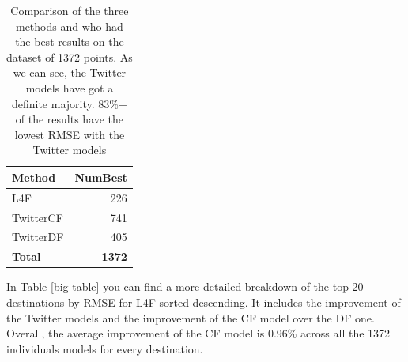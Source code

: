 \documentclass[minf,frontabs,twoside,singlespacing,parskip]{infthesis}
\begin{document}
\begin{table}[h!]
\begin{center}
\begin{tabular}{ l | r }
Method & NumBest \\
\hline
L4F & 226 \\
TwitterCF & 741 \\
TwitterDF & 405 \\
\hline
\textbf{Total} & \textbf{1372}
\end{tabular}
\end{center}
\caption{Comparison of the three methods and who had the best results on the dataset of 1372 points. As we can see, the Twitter models have got a definite majority. 83\%+ of the results have the lowest RMSE with the Twitter models}
\label{comparison-all}
\end{table}

In Table \ref{big-table} you can find a more detailed breakdown of the top 20 destinations by RMSE for L4F sorted descending. It includes the improvement of the Twitter models and the improvement of the CF model over the DF one. Overall, the average improvement of the CF model is 0.96\% across all the 1372 individuals models for every destination.
\end{document}
